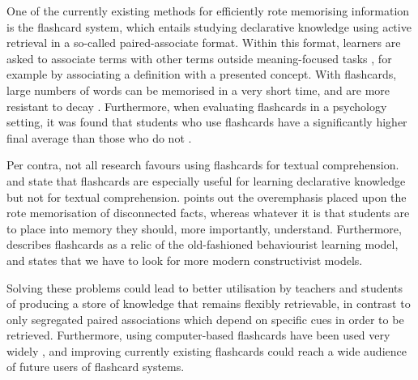 One of the currently existing methods for efficiently rote memorising information is the flashcard system, which entails studying declarative knowledge using active retrieval in a so-called paired-associate format. Within this format, learners are asked to associate terms with other terms outside meaning-focused tasks \cite{nakata}, for example by associating a definition with a presented concept. With flashcards, large numbers of words can be memorised in a very short time, and are more resistant to decay \cite{nakata, joseph}. Furthermore, when evaluating flashcards in a psychology setting, it was found that students who use flashcards have a significantly higher final average than those who do not \cite{burgess, golding}.


Per contra, not all research favours using flashcards for textual comprehension.  and  state that flashcards are especially useful for learning declarative knowledge but not for textual comprehension.  points out the overemphasis placed upon the rote memorisation of disconnected facts, whereas whatever it is that students are to place into memory they should, more importantly, understand. Furthermore,  describes flashcards as a relic of the old-fashioned behaviourist learning model, and states that we have to look for more modern constructivist models.


Solving these problems could lead to better utilisation by teachers and students of producing a store of knowledge that remains flexibly retrievable, in contrast to only segregated paired associations which depend on specific cues in order to be retrieved. Furthermore, using computer-based flashcards have been used very widely \cite{nakata,burgess, golding,kornell}, and improving currently existing flashcards could reach a wide audience of future users of flashcard systems.



